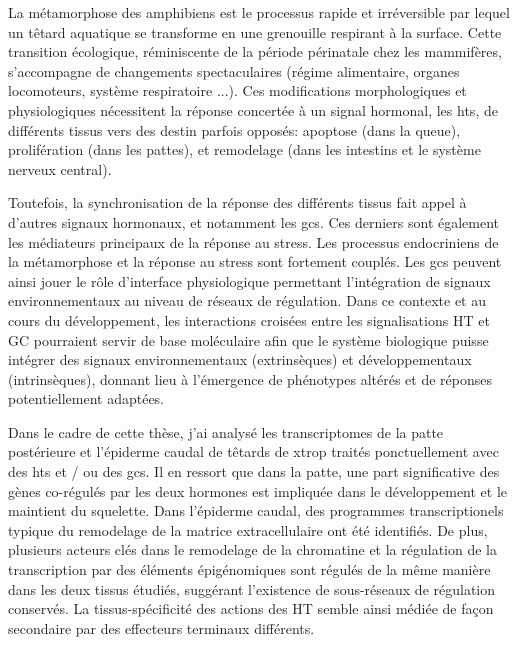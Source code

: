 % 
% 
%
La métamorphose des amphibiens est le processus rapide et irréversible par lequel un têtard aquatique se transforme en une grenouille respirant à la surface. Cette transition écologique, réminiscente de la période périnatale chez les mammifères, s'accompagne de changements spectaculaires (régime alimentaire, organes locomoteurs, système respiratoire ...). Ces modifications morphologiques et physiologiques nécessitent la réponse concertée à un signal hormonal, les \glspl{ht}, de différents tissus vers des destin parfois opposés: apoptose (dans la queue), prolifération (dans les pattes), et remodelage (dans les intestins et le système nerveux central).

Toutefois, la synchronisation de la réponse des différents tissus fait appel à d'autres signaux hormonaux, et notamment les \glspl{gc}. Ces derniers sont également les médiateurs principaux de la réponse au stress. Les processus endocriniens de la métamorphose et la réponse au stress sont fortement couplés. Les \glspl{gc} peuvent ainsi jouer le rôle d'interface physiologique permettant l'intégration de signaux environnementaux au niveau de réseaux de régulation. Dans ce contexte et au cours du développement, les interactions croisées entre les signalisations HT et GC pourraient servir de base moléculaire afin que le système biologique puisse intégrer des signaux environnementaux (extrinsèques) et développementaux (intrinsèques), donnant lieu à l'émergence de phénotypes altérés et de réponses potentiellement adaptées.

Dans le cadre de cette thèse, j'ai analysé les transcriptomes de la patte postérieure et l'épiderme caudal de têtards de \gls{xtrop} traités ponctuellement avec des \glspl{ht} et / ou des \glspl{gc}. Il en ressort que dans la patte, une part significative des gènes co-régulés par les deux hormones est impliquée dans le développement et le maintient du squelette. Dans l'épiderme caudal, des programmes transcriptionels typique du remodelage de la matrice extracellulaire ont été identifiés. De plus, plusieurs acteurs clés dans le remodelage de la chromatine et la régulation de la transcription par des éléments épigénomiques sont régulés de la même manière dans les deux tissus étudiés, suggérant l'existence de sous-réseaux de régulation conservés. La tissus-spécificité des actions des HT semble ainsi médiée de façon secondaire par des effecteurs terminaux différents.